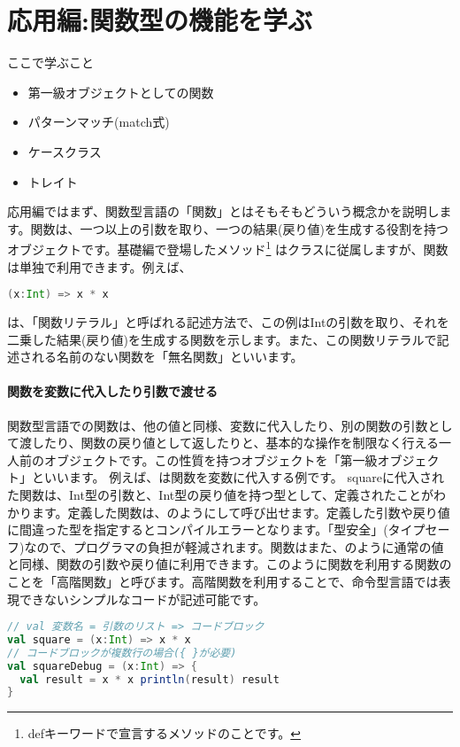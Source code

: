 \part{応用編:関数型の機能を学ぶ}
\begin{itembox}[l]{ここで学ぶこと}
\begin{itemize}
\item 第一級オブジェクトとしての関数
\item パターンマッチ(match式) 
\item ケースクラス
\item トレイト
\end{itemize}
\end{itembox}

応用編ではまず、関数型言語の「関数」とはそもそもどういう概念かを説明します。関数は、一つ以上の引数を取り、一つの結果(戻り値)を生成する役割を持つオブジェクトです。基礎編で登場したメソッド\footnote{defキーワードで宣言するメソッドのことです。} はクラスに従属しますが、関数は単独で利用できます。例えば、
\begin{lstlisting}[language=scala, frame=none]
(x:Int) => x * x
\end{lstlisting}
は、「関数リテラル」と呼ばれる記述方法で、この例はIntの引数を取り、それを二乗した結果(戻り値)を生成する関数を示します。また、この関数リテラルで記述される名前のない関数を「無名関数」といいます。 

\subsection{関数を変数に代入したり引数で渡せる}
関数型言語での関数は、他の値と同様、変数に代入したり、別の関数の引数として渡したり、関数の戻り値として返したりと、基本的な操作を制限なく行える一人前のオブジェクトです。この性質を持つオブジェクトを「第一級オブジェクト」といいます。 例えば、は関数を変数に代入する例です。 squareに代入された関数は、Int型の引数と、Int型の戻り値を持つ型として、定義されたことがわかります。定義した関数は、のようにして呼び出せます。定義した引数や戻り値に間違った型を指定するとコンパイルエラーとなります。「型安全」(タイプセーフ)なので、プログラマの負担が軽減されます。関数はまた、のように通常の値と同様、関数の引数や戻り値に利用できます。このように関数を利用する関数のことを「高階関数」と呼びます。高階関数を利用することで、命令型言語では表現できないシンプルなコードが記述可能です。

\begin{lstlisting}[language=scala, label=src:variable_function, caption=関数を変数に代入する例]
// val 変数名 = 引数のリスト => コードブロック
val square = (x:Int) => x * x
// コードブロックが複数行の場合({ }が必要)
val squareDebug = (x:Int) => {
  val result = x * x println(result) result
} 
\end{lstlisting}

